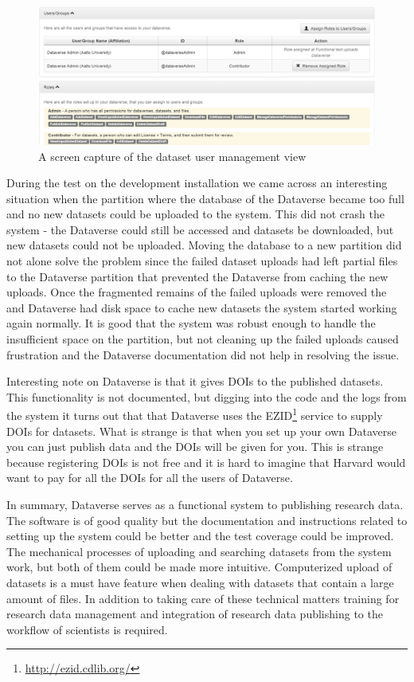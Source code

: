 \begin{figure}
    \begin{centering}
        \includegraphics[width=\textwidth]{images/admin}
    \end{centering}
    \caption{A screen capture of the dataset user management view}
    \label{fig:admin}
\end{figure}

During the test on the development installation we came across an interesting
situation when the partition where the database of the Dataverse became too
full and no new datasets could be uploaded to the system. This did not crash
the system - the Dataverse could still be accessed and datasets be downloaded,
but new datasets could not be uploaded. Moving the database to a new partition
did not alone solve the problem since the failed dataset uploads had left
partial files to the Dataverse partition that prevented the Dataverse from
caching the new uploads. Once the fragmented remains of the failed uploads
were removed the and Dataverse had disk space to cache new datasets the system
started working again normally. It is good that the system was robust enough
to handle the insufficient space on the partition, but not cleaning up the
failed uploads caused frustration and the Dataverse documentation did not
help in resolving the issue.

Interesting note on Dataverse is that it gives DOIs to the published datasets.
This functionality is not documented, but digging into the code and the logs
from the system it turns out that that Dataverse uses the
EZID\footnote{\url{http://ezid.cdlib.org/}} service to supply DOIs for
datasets. What is strange is that when you set up your own Dataverse you
can just publish data and the DOIs will be given for you. This is strange
because registering DOIs is not free and it is hard to imagine that Harvard
would want to pay for all the DOIs for all the users of Dataverse.

In summary, Dataverse serves as a functional system to publishing research
data. The software is of good quality but the documentation and instructions
related to setting up the system could be better and the test coverage could be
improved. The mechanical processes of
uploading and searching datasets from the system work, but both of them could
be made more intuitive. Computerized upload of datasets is a must have feature
when dealing with datasets that contain a large amount of files. In addition to
taking care of these technical matters training for research data management
and integration of research data publishing to the workflow of scientists is
required.

